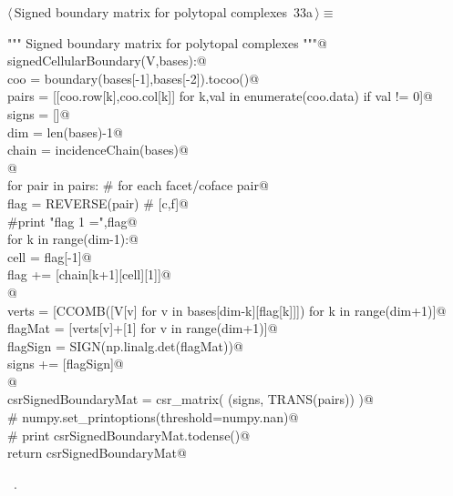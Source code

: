 \documentclass[11pt,oneside]{article}    %
\begin{document}
\begin{flushleft} \small \label{scrap53}
\protect{}$\langle\,$Signed boundary matrix for polytopal complexes\nobreak\ {\footnotesize 33a}$\,\rangle\equiv$
\vspace{-1ex}
\begin{list}{}{} \item
\mbox{}\verb@""" Signed boundary matrix for polytopal complexes """@\\
\mbox{}\verb@def signedCellularBoundary(V,bases):@\\
\mbox{}\verb@    coo = boundary(bases[-1],bases[-2]).tocoo()@\\
\mbox{}\verb@    pairs = [[coo.row[k],coo.col[k]] for k,val in enumerate(coo.data) if val != 0]@\\
\mbox{}\verb@    signs = []@\\
\mbox{}\verb@    dim = len(bases)-1@\\
\mbox{}\verb@    chain = incidenceChain(bases)@\\
\mbox{}\verb@    @\\
\mbox{}\verb@    for pair in pairs:        # for each facet/coface pair@\\
\mbox{}\verb@        flag = REVERSE(pair) #  [c,f]@\\
\mbox{}\verb@        #print "flag 1 =",flag@\\
\mbox{}\verb@        for k in range(dim-1):@\\
\mbox{}\verb@            cell = flag[-1]@\\
\mbox{}\verb@            flag += [chain[k+1][cell][1]]@\\
\mbox{}\verb@        @\\
\mbox{}\verb@        verts = [CCOMB([V[v] for v in bases[dim-k][flag[k]]]) for k in range(dim+1)]@\\
\mbox{}\verb@        flagMat = [verts[v]+[1] for v in range(dim+1)]@\\
\mbox{}\verb@        flagSign = SIGN(np.linalg.det(flagMat))@\\
\mbox{}\verb@        signs += [flagSign]@\\
\mbox{}\verb@    @\\
\mbox{}\verb@    csrSignedBoundaryMat = csr_matrix( (signs, TRANS(pairs)) )@\\
\mbox{}\verb@    # numpy.set_printoptions(threshold=numpy.nan)@\\
\mbox{}\verb@    # print csrSignedBoundaryMat.todense()@\\
\mbox{}\verb@    return csrSignedBoundaryMat@\\
\mbox{}\verb@@{\NWsep}
\end{list}
\vspace{-1ex}
\footnotesize\addtolength{\baselineskip}{-1ex}
\begin{list}{}{\setlength{\itemsep}{-\parsep}\setlength{\itemindent}{-\leftmargin}}
\item \NWtxtMacroRefIn\ .
\end{list}
\end{flushleft}
\end{document}

